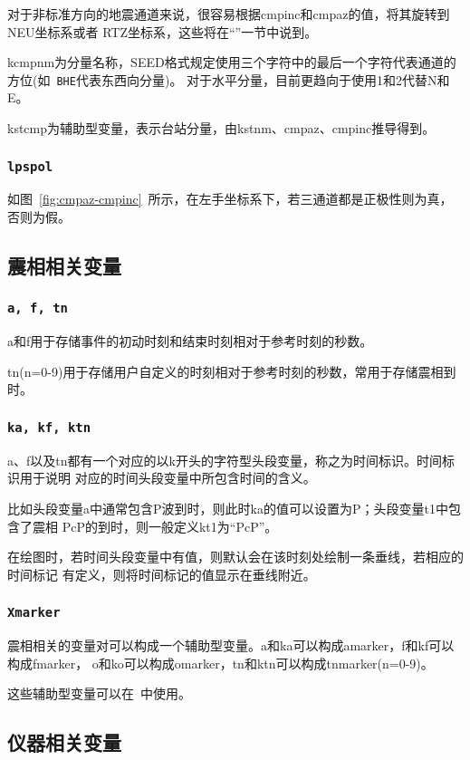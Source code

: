 对于非标准方向的地震通道来说，很容易根据cmpinc和cmpaz的值，将其旋转到NEU坐标系或者
RTZ坐标系，这些将在``''一节中说到。

kcmpnm为分量名称，SEED格式规定使用三个字符中的最后一个字符代表通道的方位(如~\verb+BHE+代表东西向分量)。
对于水平分量，目前更趋向于使用1和2代替N和E。

kstcmp为辅助型变量，表示台站分量，由kstnm、cmpaz、cmpinc推导得到。

\subsubsection{\texttt{lpspol}}
如图~\ref{fig:cmpaz-cmpinc}~所示，在左手坐标系下，若三通道都是正极性则为真，否则为假。

\subsection{震相相关变量}
\subsubsection{\texttt{a, f, tn}}
a和f用于存储事件的初动时刻和结束时刻相对于参考时刻的秒数。

tn(n=0-9)用于存储用户自定义的时刻相对于参考时刻的秒数，常用于存储震相到时。

\subsubsection{\texttt{ka, kf, ktn}}
a、f以及tn都有一个对应的以k开头的字符型头段变量，称之为时间标识。时间标识用于说明
对应的时间头段变量中所包含时间的含义。

比如头段变量a中通常包含P波到时，则此时ka的值可以设置为P；头段变量t1中包含了震相
PcP的到时，则一般定义kt1为``PcP''。

在绘图时，若时间头段变量中有值，则默认会在该时刻处绘制一条垂线，若相应的时间标记
有定义，则将时间标记的值显示在垂线附近。

\subsubsection{\texttt{Xmarker}}
震相相关的变量对可以构成一个辅助型变量。a和ka可以构成amarker，f和kf可以构成fmarker，
o和ko可以构成omarker，tn和ktn可以构成tnmarker(n=0-9)。

这些辅助型变量可以在~中使用。

\subsection{仪器相关变量}

